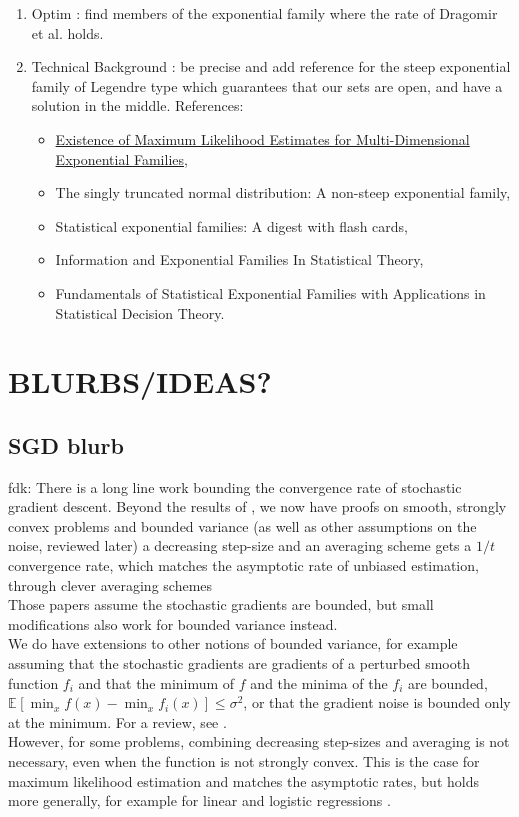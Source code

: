 \documentclass[twoside]{article}
\let\oldsection\section
\renewcommand{\section}[1]{\oldsection{\texorpdfstring{\uppercase{#1}}{#1}}}
\newcommand{\fdk}[1]{\textcolor{Periwinkle}{fdk:#1}}
\newcommand*{\expect}[2][]{\ensuremath{\mathbb{E}_{#1} \left[ #2 \right] }} %
\begin{document}
\begin{enumerate}
	\item Optim : find members of the exponential family where the rate of Dragomir et al. holds.
	\item Technical Background : be precise and add reference for the steep exponential family of Legendre type which guarantees that our sets are open, and have a solution in the middle.
	References: \begin{itemize}
		\item \href{https://www.jstor.org/stable/4616462?seq=1#metadata_info_tab_contents}{Existence of Maximum Likelihood Estimates for Multi-Dimensional Exponential Families}, 
		\item The singly truncated normal distribution: A non-steep exponential family, 
		\item Statistical exponential families: A digest with flash cards,
		\item Information and Exponential Families In Statistical Theory, 
		\item Fundamentals of Statistical Exponential Families with Applications in Statistical Decision Theory.
	\end{itemize}  
\end{enumerate}




\section{Blurbs/ideas?}



\subsection{SGD blurb}
\fdk{
%
There is a long line work bounding the convergence rate of stochastic gradient descent.
Beyond the results of \citet{robbins1951stochastic}, 
we now have proofs on smooth, strongly convex problems and bounded variance 
(as well as other assumptions on the noise, reviewed later)
a decreasing step-size and an averaging scheme gets 
a $1/t$ convergence rate, 
which matches the asymptotic rate of unbiased estimation,
through clever averaging schemes \citep{rakhlin2012making,lacostejulien2012simpler} 
\\
Those papers assume the stochastic gradients are bounded, 
but small modifications also work for bounded variance instead.
\\
We do have extensions to other notions of bounded variance, 
for example assuming that the stochastic gradients are gradients of a perturbed smooth function $f_i$ 
and that the minimum of $f$ and the minima of the $f_i$ 
are bounded, $\expect{\min_x f(x) - \min_x f_i(x)} \leq \sigma^2$,
or that the gradient noise is bounded only at the minimum. 
For a review, see \citet{gower2019sgd}.
\\
However, for some problems, combining decreasing step-sizes and averaging is not necessary,
even when the function is not strongly convex.
This is the case for maximum likelihood estimation and matches the asymptotic rates, 
but holds more generally, for example for linear and logistic regressions \citep{bach2013nonstronglyconvex,moulines2011non}.
}
\end{document}
